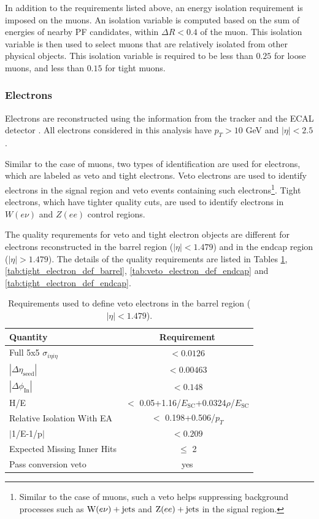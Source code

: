 In addition to the requirements listed above, an energy isolation requirement is imposed on the muons. An isolation variable 
is computed based on the sum of energies of nearby PF candidates, within $\Delta R < 0.4$ of the muon. This isolation
variable is then used to select muons that are relatively isolated from other physical objects. This isolation variable
is required to be less than $0.25$ for loose muons, and less than $0.15$ for tight muons.


\subsubsection{Electrons}
\label{subsec:electrons}

Electrons are reconstructed using the information from the tracker and the ECAL detector \cite{cms:elepho_paper}. All electrons
considered in this analysis have $p_T > 10$ GeV and $|\eta| < 2.5$.

Similar to the case of muons, two types of identification are used for electrons, which are labeled as veto and tight electrons.
Veto electrons are used to identify electrons in the signal region and veto events containing such 
electrons\footnote{Similar to the case of muons, such a veto helps suppressing background processes such as
$\mathrm{W}(e\nu)+\textrm{jets}$ and $\mathrm{Z}(ee)+\textrm{jets}$ in the signal region.}. 
Tight electrons, which have tighter
quality cuts, are used to identify electrons in $W(e \nu)$ and $Z(ee)$ control regions.

The quality requrements for veto and tight electron objects are different for electrons reconstructed in the barrel region
($|\eta| < 1.479$) and in the endcap region ($|\eta| > 1.479$). The details of the quality requirements are listed in Tables \ref{tab:veto_electron_def_barrel},
\ref{tab:tight_electron_def_barrel}, \ref{tab:veto_electron_def_endcap} and \ref{tab:tight_electron_def_endcap}.

\begin{table}[htbp]
\centering
\def\arraystretch{1.2}

\begin{tabular}{|l|c|}
    \hline\hline
    Quantity & Requirement \\\hline
    Full 5x5 $\sigma_{i\eta i\eta}$ &  $< 0.0126$ \\
    $|\Delta\eta_{\mathrm{seed}}|$ & $< 0.00463$  \\
    $|\Delta\phi_{\mathrm{In}}|$ & $< 0.148$ \\
    H/E & $<$ 0.05+1.16/$E_{\mathrm{SC}}$+0.0324$\rho$/$E_{\mathrm{SC}}$ \\
    Relative Isolation With EA & $<$ 0.198+0.506/$p_T$ \\
    $|$1/E-1/p$|$ & $< 0.209$ \\
    Expected Missing Inner Hits & $\leq$ 2 \\
    Pass conversion veto & yes \\
    \hline\hline
\end{tabular}
\caption{Requirements used to define veto electrons in the barrel region ($|\eta| < 1.479$).}
\label{tab:veto_electron_def_barrel}
\end{table}

